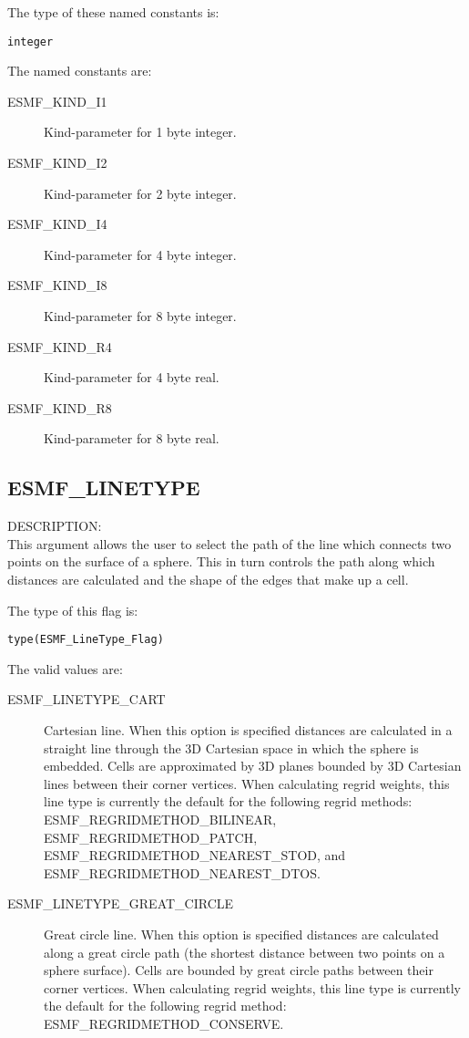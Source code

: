 The type of these named constants is:

{\tt integer}

The named constants are:
\begin{description}
\item [ESMF\_KIND\_I1]
      Kind-parameter for 1 byte integer.
\item [ESMF\_KIND\_I2]
      Kind-parameter for 2 byte integer.
\item [ESMF\_KIND\_I4]
      Kind-parameter for 4 byte integer.
\item [ESMF\_KIND\_I8]
      Kind-parameter for 8 byte integer.
\item [ESMF\_KIND\_R4]
      Kind-parameter for 4 byte real.
\item [ESMF\_KIND\_R8]
      Kind-parameter for 8 byte real.
\end{description}


\subsection{ESMF\_LINETYPE}
\label{opt:lineType}

{\sf DESCRIPTION:\\}  This argument allows the user to select the path of the line which connects two points on the surface of a sphere.
This in turn controls the path along which distances are calculated and the shape of the edges that make up a cell. 

The type of this flag is:

{\tt type(ESMF\_LineType\_Flag)}

The valid values are:
 \begin{description}
\item [ESMF\_LINETYPE\_CART]
   Cartesian line. When this option is specified distances are calculated in a straight line through the 3D Cartesian space
   in which the sphere is embedded. Cells are approximated by 3D planes bounded by 3D Cartesian lines between their corner vertices. 
   When calculating regrid weights, this line type is currently the default for the following regrid methods: ESMF\_REGRIDMETHOD\_BILINEAR, 
   ESMF\_REGRIDMETHOD\_PATCH, ESMF\_REGRIDMETHOD\_NEAREST\_STOD, and  ESMF\_REGRIDMETHOD\_NEAREST\_DTOS.
\item [ESMF\_LINETYPE\_GREAT\_CIRCLE]
   Great circle line. When this option is specified distances are calculated along a great circle path (the shortest distance
   between two points on a sphere surface). Cells are bounded by great circle paths between their corner vertices. When calculating regrid 
   weights, this line type is currently the default for the following regrid method: ESMF\_REGRIDMETHOD\_CONSERVE. 
\end{description}


